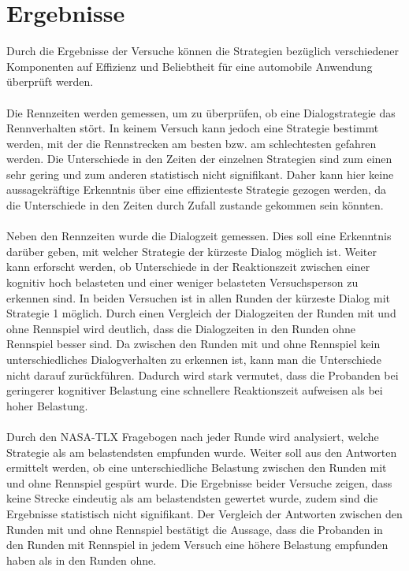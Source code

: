 \documentclass[12pt,a4paper]{scrartcl}
\begin{document}
\newpage
\section{Ergebnisse}
\label{Ergebnisse}

Durch die Ergebnisse der Versuche können die Strategien bezüglich verschiedener Komponenten auf Effizienz und Beliebtheit für eine automobile Anwendung überprüft werden. \\
\\
Die Rennzeiten werden gemessen, um zu überprüfen, ob eine Dialogstrategie das Rennverhalten stört. In keinem Versuch kann jedoch eine Strategie bestimmt werden, mit der die Rennstrecken am besten bzw. am schlechtesten gefahren werden. Die Unterschiede in den Zeiten der einzelnen Strategien sind zum einen sehr gering und zum anderen statistisch nicht signifikant. Daher kann hier keine aussagekräftige Erkenntnis über eine effizienteste Strategie gezogen werden, da die Unterschiede in den Zeiten durch Zufall zustande gekommen sein könnten.\\
\\
Neben den Rennzeiten wurde die Dialogzeit gemessen. Dies soll eine Erkenntnis darüber geben, mit welcher Strategie der kürzeste Dialog möglich ist. Weiter kann erforscht werden, ob Unterschiede in der Reaktionszeit zwischen einer kognitiv hoch belasteten und einer weniger belasteten Versuchsperson zu erkennen sind. In beiden Versuchen ist in allen Runden der kürzeste Dialog mit Strategie 1 möglich. Durch einen Vergleich der Dialogzeiten der Runden mit und ohne Rennspiel wird deutlich, dass die Dialogzeiten in den Runden ohne Rennspiel besser sind. Da zwischen den Runden mit und ohne Rennspiel kein unterschiedliches Dialogverhalten zu erkennen ist, kann man die Unterschiede nicht darauf zurückführen. Dadurch wird stark vermutet, dass die Probanden bei geringerer kognitiver Belastung eine schnellere Reaktionszeit aufweisen als bei hoher Belastung. \\
\\
Durch den NASA-TLX Fragebogen nach jeder Runde wird analysiert, welche Strategie als am belastendsten empfunden wurde. Weiter soll aus den Antworten ermittelt werden, ob eine unterschiedliche Belastung zwischen den Runden mit und ohne Rennspiel gespürt wurde.  
Die Ergebnisse beider Versuche zeigen, dass keine Strecke eindeutig als am belastendsten gewertet wurde, zudem sind die Ergebnisse statistisch nicht signifikant. 
Der Vergleich der Antworten zwischen den Runden mit und ohne Rennspiel bestätigt die Aussage, dass die Probanden in den Runden mit Rennspiel in jedem Versuch eine höhere Belastung empfunden haben als in den Runden ohne. \\
\end{document}
